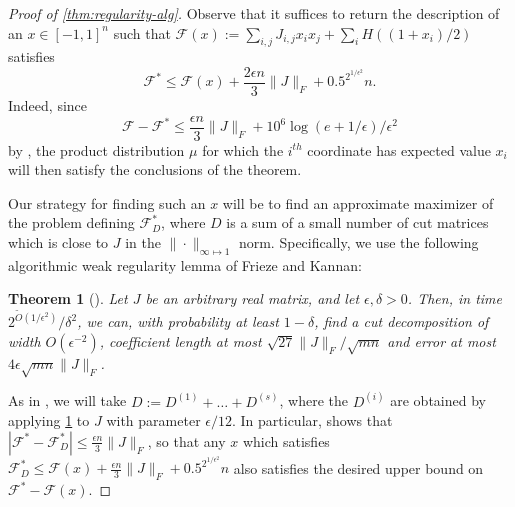 \documentclass[final, 12pt]{colt2018}
\newcommand{\F}{\mathcal{F}}
\newtheorem{theorem}{Theorem}[section]
\theoremstyle{definition}
\theoremstyle{plain}
\begin{document}
\begin{proof}[Proof of \cref{thm:regularity-alg}]
Observe that it suffices to return the description of an $x \in [-1,1]^{n}$ such that $\F(x):= \sum_{i,j}J_{i,j}x_ix_j + \sum_i H((1+x_i)/2)$ satisfies 
$$\F^* \leq \F(x) + \frac{2\epsilon n}{3}\|J\|_{F} + 0.5^{2^{1/\epsilon^2}}n .$$ 
Indeed, since \[ \mathcal{F} - \mathcal{F^*} \le \frac{\epsilon n}{3} \|J\|_F + 10^6 \log(e+1/\epsilon)/\epsilon^2 \]
by , the product distribution $\mu$ for which the $i^{th}$ coordinate has expected value $x_i$ will then satisfy the conclusions of the theorem.  

Our strategy for finding such an $x$ will be to find an approximate maximizer of the problem defining $\F^*_{D}$, where $D$ is a sum of a small number of cut matrices which is close to $J$ in the $\|\cdot\|_{\infty \mapsto 1}$ norm. Specifically, we %
use the following algorithmic weak regularity lemma of Frieze and Kannan:
\begin{theorem}[\citet{frieze-kannan-matrix}]
\label{fk-algorithmic}
Let $J$ be an arbitrary real matrix, and let $\epsilon,\delta>0$.
Then, in time $2^{\tilde{O}(1/\epsilon^{2})}/\delta^{2}$, we can,
with probability at least $1-\delta$, find a cut decomposition of width
$O(\epsilon^{-2})$, coefficient length at most $\sqrt{27}\|J\|_F/\sqrt{mn}$
and error at most $4\epsilon\sqrt{mn}\|J\|_F$. 
\end{theorem}
As in , we will take $D := D^{(1)}+\dots + D^{(s)}$, where the $D^{(i)}$ are obtained by applying \cref{fk-algorithmic} to $J$ with parameter $\epsilon/12$. In particular,  shows that $|\F^* - \F^*_{D}| \leq \frac{\epsilon n}{3}\|J\|_{F}$, so that any $x$ which satisfies $\F^*_{D} \leq \F(x) + \frac{\epsilon n}{3}\|J\|_{F} + 0.5^{2^{1/\epsilon^2}}n$ also satisfies the desired upper bound on $\F^* - \F(x)$.  


\end{proof}
\end{document}
